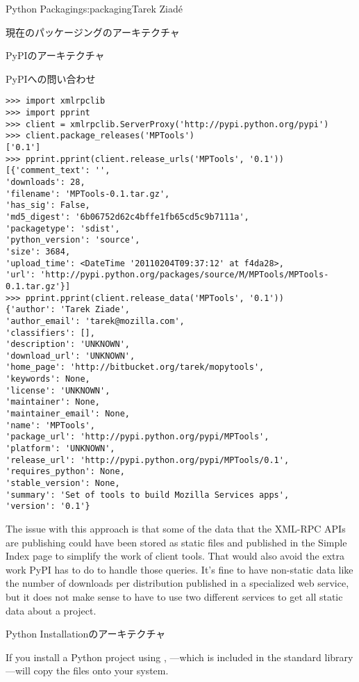 \begin{aosachapter}{Python Packaging}{s:packaging}{Tarek Ziad\'{e}}
\begin{aosasect1}{現在のパッケージングのアーキテクチャ}
\begin{aosasect2}{PyPIのアーキテクチャ}
\begin{aosasect3}{PyPIへの問い合わせ}
\begin{verbatim}
>>> import xmlrpclib
>>> import pprint
>>> client = xmlrpclib.ServerProxy('http://pypi.python.org/pypi')
>>> client.package_releases('MPTools')
['0.1']
>>> pprint.pprint(client.release_urls('MPTools', '0.1'))
[{'comment_text': '',
'downloads': 28,
'filename': 'MPTools-0.1.tar.gz',
'has_sig': False,
'md5_digest': '6b06752d62c4bffe1fb65cd5c9b7111a',
'packagetype': 'sdist',
'python_version': 'source',
'size': 3684,
'upload_time': <DateTime '20110204T09:37:12' at f4da28>,
'url': 'http://pypi.python.org/packages/source/M/MPTools/MPTools-0.1.tar.gz'}]
>>> pprint.pprint(client.release_data('MPTools', '0.1'))
{'author': 'Tarek Ziade',
'author_email': 'tarek@mozilla.com',
'classifiers': [],
'description': 'UNKNOWN',
'download_url': 'UNKNOWN',
'home_page': 'http://bitbucket.org/tarek/mopytools',
'keywords': None,
'license': 'UNKNOWN',
'maintainer': None,
'maintainer_email': None,
'name': 'MPTools',
'package_url': 'http://pypi.python.org/pypi/MPTools',
'platform': 'UNKNOWN',
'release_url': 'http://pypi.python.org/pypi/MPTools/0.1',
'requires_python': None,
'stable_version': None,
'summary': 'Set of tools to build Mozilla Services apps',
'version': '0.1'}
\end{verbatim}

\noindent The issue with this approach is that some of the data that the XML-RPC
APIs are publishing could have been stored as static files and
published in the Simple Index page to simplify the work of client
tools.  That would also avoid the extra work PyPI has to do to handle
those queries.  It's fine to have non-static data like the number of
downloads per distribution published in a specialized web service, but
it does not make sense to have to use two different services to get
all static data about a project.

\end{aosasect3}

\end{aosasect2}

\begin{aosasect2}{Python Installationのアーキテクチャ}

If you install a Python project using ,
---which is included in the standard library---will
copy the files onto your system.

\begin{aosaitemize}


\end{aosaitemize}
\end{aosasect2}
\end{aosasect1}
\end{aosachapter}
